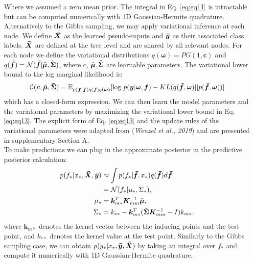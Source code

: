 \documentclass[preprint,11pt]{elsarticle}
\begin{document}
                Where we assumed a zero mean prior. The integral in Eq. \ref{eq:eq11}
        is intractable but can be computed numerically with 1D
        Gaussian-Hermite quadrature.
        \\
        Alternatively to the Gibbs sampling, we may apply variational
        inference at each node. We define $\bm{\Bar{X}}$
        as the learned
        pseudo-inputs and $ \bm{\Bar{y}}$ as their associated class labels. $\bm{\Bar{X}}$
        are defined at the tree level and are shared by all relevant
        nodes. For each node we define the variational distributions
       $ q(\bm{\omega}) = PG(1, \bm{c})$ and $q( \bm{\Bar{f}}) = \mathcal{N}( \bm{\Bar{f}}|\Tilde{\bm{\mu}}, \Tilde{\bm{\Sigma}})$, where c, $\Tilde{\bm{\mu}}$,$\Tilde{\bm{\Sigma}}$
        are learnable parameters. The variational lower bound to
        the log marginal likelihood is:
        \begin{equation}
        \label{eq:eq13}
            \mathcal{C}(\bm{c},\bm{\Tilde{\bm{\mu}}},\bm{\Tilde{\bm{\Sigma}}}) = \mathbb{E}_{p( \bm{f} | \bm{\Bar{f}} ) q(\bm{\Bar{f}})q(\bm{\omega}) } [ \log \,p( \bm{y}|\bm{\omega}, \bm{f}) - KL( q( \bm{\Bar{f}},\bm{\omega} )|| p( \bm{\Bar{f}},\bm{\omega} ) ) ]
        \end{equation}
        which has a closed-form expression. We can then learn
        the model parameters and the variational parameters by maximizing the variational lower bound in Eq. \ref{eq:eq13}. The
        explicit form of Eq. \ref{eq:eq13} and the update rules of the variational
        parameters were adapted from (\textit{Wenzel et al., 2019}\cite{wenzel2019efficient}) and are
        presented in supplementary Section A.
        \\
        To make predictions we can plug in the approximate posterior
        in the predictive posterior calculation:
        \begin{equation}
        \label{eq:eq14}
        \begin{aligned}
            p( f_*|x_*,\bm{\Bar{X}},\bm{\Bar{y}} ) &\approx \int p( f_*|\bm{\Bar{f}},x_* )q( \bm{\Bar{f}} )d\bm{\Bar{f}} \\
            &= \mathcal{N}( f_*|\mu_*,\Sigma_* ), \\
            \mu_* &= \bm{k}_{m*}^T\bm{K}_{mm}^{-1}\Tilde{\bm{\mu}}, \\
            \Sigma_* &= k_{**}-\bm{k}_{m*}^T( \Tilde{\bm{\Sigma}}\bm{K}_{mm}^{-1} - I )k_{m*},
        \end{aligned}
        \end{equation}
        where $\bm{k}_{m*}$ denotes the kernel vector between the inducing
        points and the test point, and $k_{**}$ denotes the kernel value
        at the test point. Similarly to the Gibbs sampling case,
        we can obtain $p( y_*|x_*,\bm{\Bar{y}},\bm{\Bar{X}} )$ by taking an integral over
        $f_*$ and compute it numerically with 1D Gaussian-Hermite
        quadrature.
\end{document}
